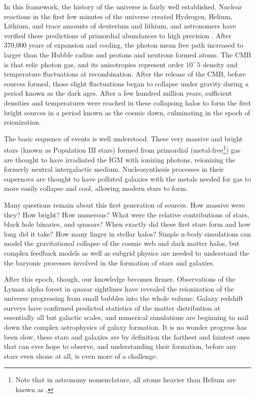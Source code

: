 In this framework, the history of the universe is fairly well established. Nuclear reactions in the first few minutes of the universe created Hydrogen, Helium, Lithium, and trace amounts of deuterium and lithium, and astronomers have verified these predictions of primordial abundances to high precision \citep{bbn}. After 370,000 years of expansion and cooling, the photon mean free path increased to larger than the Hubble radius and protons and neutrons formed atoms. The CMB is that relic photon gas, and its anisotropies represent order $10^-5$ density and temperature fluctuations at recombination. After the release of the CMB, before sources formed, those slight fluctuations began to collapse under gravity during a period known as the dark ages. After a few hundred million years, sufficient densities and temperatures were reached in these collapsing halos to form the first bright sources in a period known as the cosmic dawn, culminating in the epoch of reionization. 

The basic sequence of events is well understood. These very massive and bright stars (known as Population III stars) formed from primordial (metal-free\footnote{Note that in astronomy nomenclature, all atoms heavier than Helium are known as .}) gas are thought to have irradiated the IGM with ionizing photons, reionizing the formerly neutral intergalactic medium. Nucleosynthesis processes in their supernova are thought to have polluted galaxies with the metals needed for gas to more easily collapse and cool, allowing modern stars to form. 

Many questions remain about this first generation of sources. How massive were they? How bright? How numerous? What were the relative contributions of stars, black hole binaries, and quasars? When exactly did these first stars form and how long did it take? How many linger in stellar halos? Simple n-body simulations can model the gravitational collapse of the cosmic web and dark matter halos, but complex feedback models as well as subgrid physics are needed to understand the the baryonic processes involved in the formation of stars and galaxies. 

After this epoch, though, our knowledge becomes firmer. Observations of the Lyman alpha forest in quasar sightlines have revealed the reionization of the universe progressing from small bubbles into the whole volume. Galaxy redshift surveys have confirmed predicted statistics of the matter distribution at essentially all but galactic scales, and numerical simulations are beginning to nail down the complex astrophysics of galaxy formation. It is no wonder progress has been slow, these stars and galaxies are by definition the farthest and faintest ones that can ever hope to observe, and understanding their formation, before any stars even shone at all, is even more of a challenge. 

